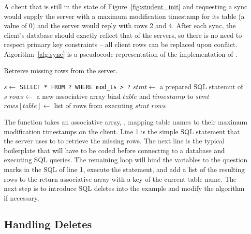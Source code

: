 A client that is still in the state of Figure~\ref{fig:student_init} and
requesting a sync would supply the server with a maximum modification
timestamp for its  table (a value of 0) and the server would reply with
rows 2 and 4. After each sync, the client's database should exactly reflect that
of the servers, so there is no need to respect primary key constraints -- all
client rows can be replaced upon conflict. Algorithm~\ref{alg:sync} is a
pseudocode representation of the implementation of \sync.

\begin{algorithm}[h]
\caption{Retreive missing rows from the server.}
\label{alg:sync}
\begin{algorithmic}[1]


  \STATE $s \gets $ \texttt{\sq SELECT * FROM ? WHERE mod\_ts > ?\sq}
  \STATE $stmt \gets $ a prepared SQL statemnt of $s$
  \STATE $rows \gets$ a new associative array
    \STATE bind $table$ and $timestamp$ to $stmt$
    \STATE $rows[table] \gets$ list of rows from executing $stmt$
  \ENDFOR
  \RETURN $rows$
  
\end{algorithmic}
\end{algorithm}

The  function takes an associative array, , mapping table
names to their maximum modification timestamps on the client. Line 1 is the
simple SQL statement that the server uses to to retrieve the missing rows.
The next line is the typical boilerplate that will have to be coded before
connecting to a database and executing SQL queries. The remaining loop will bind
the variables to the question marks in the SQL of line 1, execute the statement,
and add a list of the resulting rows to the return associative array with a key
of the current table name.  The next step is to introduce SQL deletes into the
example and modify the algorithm if necessary.

\subsection{Handling Deletes}  \label{sec:}


